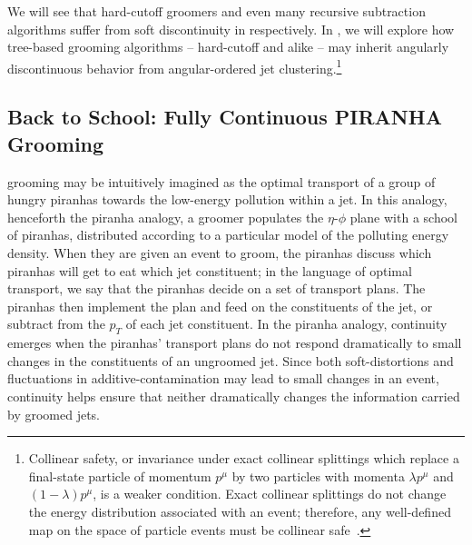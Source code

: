 We will see that hard-cutoff groomers and even many recursive subtraction algorithms suffer from soft discontinuity in  respectively.
%
In , we will explore how tree-based grooming algorithms -- hard-cutoff and \PIRANHA{} alike -- may inherit angularly discontinuous behavior from angular-ordered jet clustering.\footnote{
Collinear safety, or invariance under exact collinear splittings which replace a final-state particle of momentum \(p^\mu\) by two particles with momenta \(\lambda p^\mu\) and \((1-\lambda) p^\mu\), is a weaker condition.
%
Exact collinear splittings do not change the energy distribution associated with an event; therefore, any well-defined map on the space of particle events must be collinear safe~\cite{Komiske:2020qhg}.
}



\subsection[Back to School: Fully Continuous \textsc{Piranha} Grooming]{Back to School: Fully Continuous PIRANHA Grooming}
\label{sec:fully-continuous-piranha}

\PIRANHA{} grooming may be intuitively imagined as the optimal transport of a group of hungry piranhas towards the low-energy pollution within a jet.
%
In this analogy, henceforth the piranha analogy, a \PIRANHA{} groomer populates the \(\eta\)-\(\phi\) plane with a school of piranhas, distributed according to a particular model of the polluting energy density.
%
When they are given an event to groom, the piranhas discuss which piranhas will get to eat which jet constituent;
%
in the language of optimal transport, we say that the piranhas decide on a set of transport plans.
%
The piranhas then implement the plan and feed on the constituents of the jet, or subtract from the \(p_T\) of each jet constituent.
%
%
In the piranha analogy, continuity emerges when the piranhas' transport plans do not respond dramatically to small changes in the constituents of an ungroomed jet.
%
Since both \glspl{soft-distortion} and fluctuations in \gls{additive-contamination} may lead to small changes in an event, continuity helps ensure that neither dramatically changes the information carried by groomed jets.



